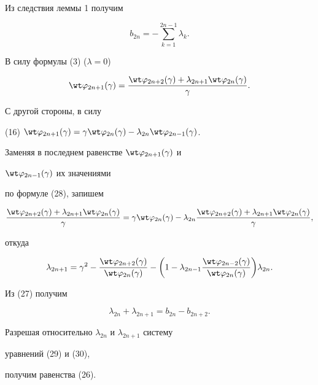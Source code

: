 \begin{pf} 


Из следствия леммы 1 получим 


\begin{equation} 


b_{2n}=-\sum^{2n-1}_{k=1}\lambda_k. 


\end{equation} 


В силу формулы (3) ($\lambda=0$) 


\begin{equation} 


\wt\varphi_{2n+1}(\gamma)= 


\frac{\wt\varphi_{2n+2}(\gamma)+\lambda_{2n+1} 


\wt\varphi_{2n}(\gamma)}{\gamma}.


\end{equation} 


С другой стороны, в силу 


(16)\; $\wt\varphi_{2n+1}(\gamma)=\gamma\wt\varphi_{2n}(\gamma) 


-\lambda_{2n}\wt\varphi_{2n-1}(\gamma)$. 


Заменяя в последнем равенстве $\wt\varphi_{2n+1}(\gamma)$ и 


$\wt\varphi_{2n-1}(\gamma)$ их значениями 


по формуле (28), запишем 


$$ 


\frac{\wt\varphi_{2n+2}(\gamma)+\lambda_{2n+1} 


\wt\varphi_{2n}(\gamma)}{\gamma}=\gamma\wt\varphi_{2n}(\gamma)- 


\lambda_{2n}\frac{\wt\varphi_{2n+2}(\gamma)+ 


\lambda_{2n+1}\wt\varphi_{2n}(\gamma)}{\gamma}, 


$$ 


откуда 


\begin{equation} 


\lambda_{2n+1}=\gamma^2-\frac{\wt\varphi_{2n+2}(\gamma)} 


{\wt\varphi_{2n}(\gamma)}-\bigg(1-\lambda_{2n-1} 


\frac{\wt\varphi_{2n-2}(\gamma)}{\wt\varphi_{2n}(\gamma)}\bigg) 


\lambda_{2n}. 


\end{equation} 


Из (27) получим 


\begin{equation} 


\lambda_{2n}+\lambda_{2n+1}=b_{2n}-b_{2n+2}. 


\end{equation} 


Разрешая относительно $\lambda_{2n}$ и $\lambda_{2n+1}$ систему 


уравнений (29) и (30), 


получим равенства (26). 


\end{pf} 


